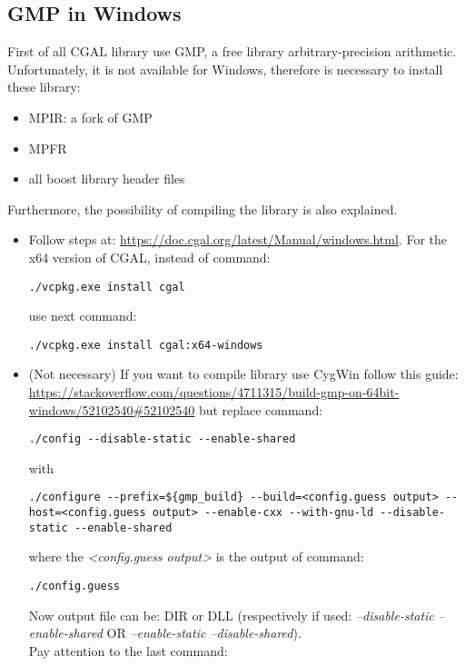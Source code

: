 \documentclass[11pt, english, openany]{report}
\begin{document}
\begin{appendices}
\subsection{GMP in Windows} \label{sec:cgalLib}
First of all CGAL library use GMP, a free library arbitrary-precision arithmetic.  Unfortunately, it is not available for Windows, therefore is necessary to install these library: 
\begin{itemize}
	\item MPIR: a fork of GMP
	\item MPFR
	\item all boost library header files
\end{itemize}
Furthermore, the possibility of compiling the library is also explained.

\begin{itemize}
\item Follow steps at: \href{https://doc.cgal.org/latest/Manual/windows.html}{https://doc.cgal.org/latest/Manual/windows.html}. For the x64 version of CGAL, instead of command:
\begin{lstlisting}
./vcpkg.exe install cgal
\end{lstlisting}
 use next command:
\begin{lstlisting}
./vcpkg.exe install cgal:x64-windows   
\end{lstlisting}
\item (Not necessary) If you want to compile library use CygWin follow this guide: \\ \href{https://stackoverflow.com/questions/4711315/build-gmp-on-64bit-windows/52102540#52102540}{https://stackoverflow.com/questions/4711315/build-gmp-on-64bit-windows/52102540\#52102540} but replace command:
\begin{lstlisting}
./config --disable-static --enable-shared
\end{lstlisting}
with
\begin{lstlisting}
./configure --prefix=${gmp_build} --build=<config.guess output> --host=<config.guess output> --enable-cxx --with-gnu-ld --disable-static --enable-shared
\end{lstlisting}
where the \textit{<config.guess output>} is the output of command: 
\begin{lstlisting}
./config.guess
\end{lstlisting}
Now output file can be: DIR or DLL (respectively if used: \textit{--disable-static --enable-shared} OR \textit{--enable-static --disable-shared}).\\
Pay attention to the last command:

\end{itemize}
\end{appendices}
\end{document}
